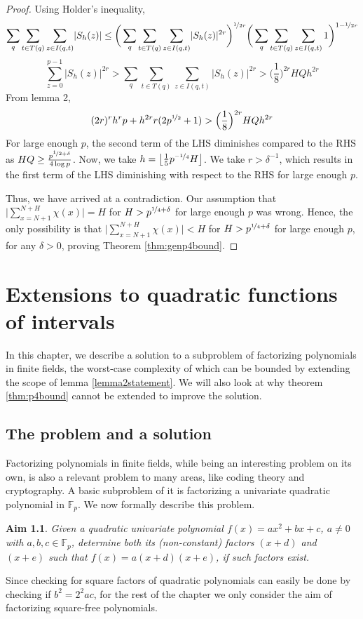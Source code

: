 \documentclass{report}
\newtheorem*{aim*}{Aim}
\newcommand{\ignore}[1]{}
\begin{document}
\begin{proof}
Using Holder's inequality,
$$\sum_q\sum\limits_{t\in T(q)}\sum\limits_{z\in I(q,t)}\lvert S_h(z) \rvert \leq \bigg ( \sum_q\sum\limits_{t\in T(q)}\sum\limits_{z\in I(q,t)}\lvert S_h(z) \rvert^{2r} \bigg )^{\nicefrac{1}{2r}}\bigg ( \sum_q\sum\limits_{t\in T(q)}\sum\limits_{z\in I(q,t)}1 \bigg )^{1-\nicefrac{1}{2r}}$$
$$\sum\limits_{z=0}^{p-1}\lvert S_h(z) \rvert^{2r}> \sum_q\sum\limits_{t\in T(q)}\sum\limits_{z\in I(q,t)}\lvert S_h(z) \rvert^{2r}> \Big(\frac{1}{8}\Big)^{2r}HQh^{2r}$$
From lemma 2,
$$(2r)^{r}h^{r}p+h^{2r}r(2p^{\nicefrac{1}{2}}+1)>\Big(\frac{1}{8}\Big)^{2r}HQh^{2r}$$
For large enough $p$, the second term of the LHS diminishes compared to the RHS as $HQ\geq \frac{p^{\nicefrac{1}{2}+\delta}}{4\log p}$. Now, we take $h=\left \lfloor \frac{1}{5}p^{\nicefrac{-1}{4}}H \right \rfloor$. We take $r>\delta^{-1}$, which results in the first term of the LHS diminishing with respect to the RHS for large enough $p$.

Thus, we have arrived at a contradiction. Our assumption that $\Big \lvert \sum\limits_{x=N+1}^{N+H}\chi(x)\Big \rvert=H$ for $H>p^{\nicefrac{1}{4}+\delta}$ for large enough $p$ was wrong. Hence, the only possibility is that $\Big \lvert \sum\limits_{x=N+1}^{N+H}\chi(x)\Big \rvert<H$ for $H>p^{\nicefrac{1}{4}+\delta}$ for large enough $p$, for any $\delta>0$, proving Theorem \ref{thm:genp4bound}.
\end{proof}
%
\chapter{Extensions to quadratic functions of intervals}
In this chapter, we describe a solution to a subproblem of factorizing polynomials in finite fields\ignore{a practically relevant problem}, the worst-case complexity of which can be bounded by extending the scope of lemma \ref{lemma2statement}. We will also look at why theorem \ref{thm:p4bound} cannot be extended to improve the solution.
%
%
\section{The problem and a solution}
%
Factorizing polynomials in finite fields, while being an interesting problem on its own, is also a relevant problem to many areas, like coding theory and cryptography. A basic subproblem of it is factorizing a univariate quadratic polynomial in $\mathbb{F}_p$. We now formally describe this problem.
%
\begin{aim*}
Given a quadratic univariate polynomial $f(x)=ax^2+bx+c$, $a\neq 0$ with $a,b,c\in\mathbb{F}_p$, determine both its (non-constant) factors $(x+d)$ and $(x+e)$ such that $f(x)=a(x+d)(x+e)$, if such factors exist.
\end{aim*}
%
Since checking for square factors of quadratic polynomials can easily be done by checking if $b^2=2^{2}ac$, for the rest of the chapter we only consider the aim of factorizing square-free polynomials.\ignore{We next describe a method to achieve this.}
\end{document}
